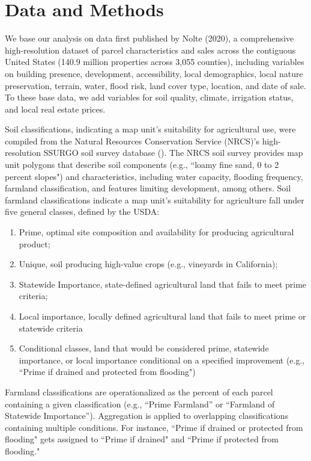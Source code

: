 \documentclass[12pt]{article}
\begin{document}
\section{Data and Methods}
We base our analysis on data first published by Nolte (2020), a comprehensive high-resolution dataset of parcel characteristics and sales across the contiguous United States (140.9 million properties across 3,055 counties), including variables on building presence, development, accessibility, local demographics, local nature preservation, terrain, water, flood risk, land cover type, location, and date of sale. To these base data, we add variables for soil quality, climate, irrigation status, and local real estate prices.

Soil classifications, indicating a map unit's suitability for agricultural use, were compiled from the Natural Resources Conservation Service (NRCS)’s high-resolution SSURGO soil survey database (\cite{SoilSurveyStaffSoilStates}). The NRCS soil survey provides map unit polygons that describe soil components (e.g., ``loamy fine sand, 0 to 2 percent slopes") and characteristics, including water capacity, flooding frequency, farmland classification, and features limiting development, among others. Soil farmland classifications indicate a map unit's suitability for agriculture fall under five general classes, defined by the USDA:
\begin{enumerate}
    \item Prime, optimal site composition and availability for producing agricultural product;  
    \item Unique, soil producing high-value crops (e.g., vineyards in California); 
    \item Statewide Importance, state-defined agricultural land that fails to meet prime criteria;
    \item Local importance, locally defined agricultural land that fails to meet prime or statewide criteria
    \item Conditional classes, land that would be considered prime, statewide importance, or local importance conditional on a specified improvement (e.g., ``Prime if drained and protected from flooding")
\end{enumerate}

Farmland classifications are operationalized as the percent of each parcel containing a given classification (e.g., ``Prime Farmland” or ``Farmland of Statewide Importance”). Aggregation is applied to overlapping classifications containing multiple conditions. For instance, ``Prime if drained or protected from flooding" gets assigned to ``Prime if drained" and ``Prime if protected from flooding." 
\end{document}
